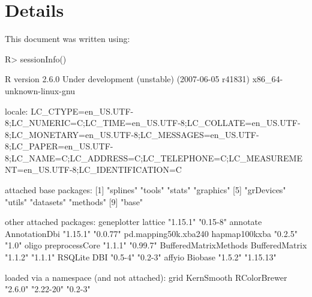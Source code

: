 \documentclass{article}
\begin{document}
\section{Details}

This document was written using:

\begin{Schunk}
\begin{Sinput}
R> sessionInfo()
\end{Sinput}
\begin{Soutput}
R version 2.6.0 Under development (unstable) (2007-06-05 r41831) 
x86_64-unknown-linux-gnu 

locale:
LC_CTYPE=en_US.UTF-8;LC_NUMERIC=C;LC_TIME=en_US.UTF-8;LC_COLLATE=en_US.UTF-8;LC_MONETARY=en_US.UTF-8;LC_MESSAGES=en_US.UTF-8;LC_PAPER=en_US.UTF-8;LC_NAME=C;LC_ADDRESS=C;LC_TELEPHONE=C;LC_MEASUREMENT=en_US.UTF-8;LC_IDENTIFICATION=C

attached base packages:
[1] "splines"   "tools"     "stats"     "graphics" 
[5] "grDevices" "utils"     "datasets"  "methods"  
[9] "base"     

other attached packages:
          geneplotter               lattice 
             "1.15.1"              "0.15-8" 
             annotate         AnnotationDbi 
             "1.15.1"              "0.0.77" 
 pd.mapping50k.xba240         hapmap100kxba 
              "0.2.5"                 "1.0" 
                oligo        preprocessCore 
              "1.1.1"              "0.99.7" 
BufferedMatrixMethods        BufferedMatrix 
              "1.1.2"               "1.1.1" 
              RSQLite                   DBI 
              "0.5-4"               "0.2-3" 
               affyio               Biobase 
              "1.5.2"             "1.15.13" 

loaded via a namespace (and not attached):
        grid   KernSmooth RColorBrewer 
     "2.6.0"    "2.22-20"      "0.2-3" 
\end{Soutput}
\end{Schunk}
\end{document}

